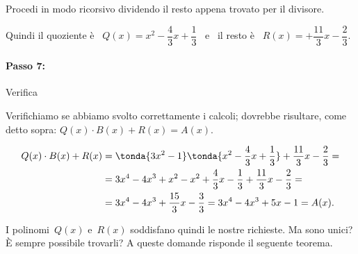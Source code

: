 \begin{esempio}{}{}
Procedi in modo ricorsivo dividendo il resto appena trovato per il 
divisore. 


Quindi il 
quoziente è~ \(Q(x)=x^2-\dfrac{4}{3}x+\dfrac{1}{3}\)~ e~ il
resto è~ \(R(x)=+{\dfrac{11}{3}}x-\dfrac{2}{3}\).
\end{esempio}

\paragraph{Passo 7: } Verifica

\begin{esempio}{}{}

Verifichiamo se abbiamo svolto correttamente i calcoli; dovrebbe risultare, 
come detto sopra: \(Q(x)\cdot B(x)+R(x) = A(x)\).

\vspace{-1.5em}
\begin{equation*}
\begin{split}
Q(x)\cdot B(x)+R(x) &= 
\tonda{3x^2-1}\tonda{x^2-\dfrac{4}{3}x+\dfrac{1}{3}}+
\dfrac{11}{3}x-\dfrac{2}{3} =\\ 
&=3x^4-4x^3+x^2-x^2+\dfrac{4}{3}x-
  \dfrac{1}{3}+\dfrac{11}{3}x-\dfrac{2}{3}=\\
&= 3x^4-4x^3+\dfrac{15}{3}x-\dfrac{3}{3}
= 3x^4-4x^3+5x-1 = A(x).
\end{split}
\end{equation*}
\end{esempio}

I polinomi~\(Q(x)\) e~\(R(x)\) soddisfano quindi le nostre richieste. 
Ma sono unici? È sempre possibile trovarli? 
A queste domande risponde il seguente teorema.

